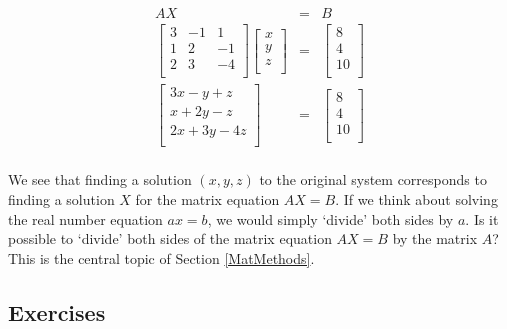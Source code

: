 \documentclass{ximera}
\begin{document}
\[ \begin{array}{rcl}

AX & = & B \\ [13pt]
\left[ \begin{array}{rrr} 3 & -1 & 1  \\ 1 & 2 & -1  \\ 2 & 3 & -4  \\ \end{array} \right] \left[ \begin{array}{r}  x \\  y \\  z \\ \end{array} \right] & = & \left[ \begin{array}{r}  8 \\  4 \\  10 \\ \end{array} \right] \\ [13pt]

\left[ \begin{array}{rrr} 3x -y +z  \\ x + 2y  -z  \\ 2x + 3y  -4 z \\ \end{array} \right] & = & \left[ \begin{array}{r}  8 \\  4 \\  10 \\ \end{array} \right] \\ [13pt]

\end{array}\]

We see that finding a solution $(x,y,z)$ to the original system corresponds to finding a solution $X$ for the matrix equation $AX = B$.   If we think about solving the real number equation $ax = b$, we would simply `divide' both sides by $a$. Is it possible to `divide' both sides of the matrix equation $AX = B$ by the matrix $A$?    This is the central topic of Section \ref{MatMethods}. 

\newpage

\subsection{Exercises}



\closegraphsfile
\end{document}
